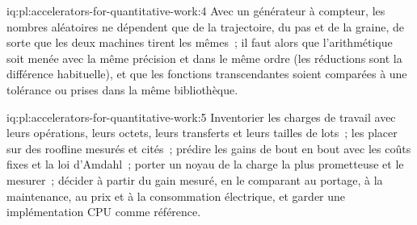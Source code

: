 \begin{solution}{iq:pl:accelerators-for-quantitative-work:4}
Avec un générateur à compteur, les nombres aléatoires ne dépendent que de la trajectoire, du pas et de la graine, de sorte que les deux machines tirent les mêmes~; il
faut alors que l'arithmétique soit menée avec la même précision et dans le même ordre (les réductions sont la différence habituelle), et que les fonctions transcendantes soient comparées à une
tolérance ou prises dans la même bibliothèque.
\end{solution}

\begin{solution}{iq:pl:accelerators-for-quantitative-work:5}
Inventorier les charges de travail avec leurs opérations, leurs octets, leurs transferts et leurs tailles de lots~; les placer sur des roofline mesurés et cités~; prédire les
gains de bout en bout avec les coûts fixes et la loi d'Amdahl~; porter un noyau de la charge la plus prometteuse et le mesurer~; décider à partir du gain mesuré,
en le comparant au portage, à la maintenance, au prix et à la consommation électrique, et garder une implémentation CPU comme référence.
\end{solution}
